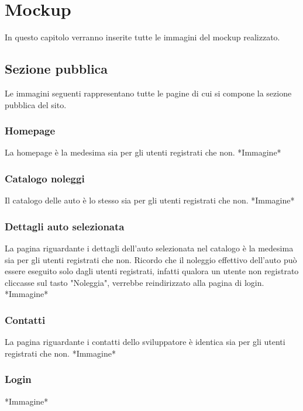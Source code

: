 \documentclass[12pt,a4paperS]{report}
\begin{document}
	\hypertarget{mockup}{\chapter{Mockup}}
	\label{mockup}
	\begin{normalsize}
		In questo capitolo verranno inserite tutte le immagini del mockup realizzato.
		
		\section{Sezione pubblica}
			Le immagini seguenti rappresentano tutte le pagine di cui si compone la sezione pubblica del sito.
			
			\subsection{Homepage}
				La homepage è la medesima sia per gli utenti registrati che non.
				\newline
				*Immagine*
				
			\subsection{Catalogo noleggi}
				Il catalogo delle auto è lo stesso sia per gli utenti registrati che non.
				\newline
				*Immagine*
			
			\subsection{Dettagli auto selezionata}
				La pagina riguardante i dettagli dell'auto selezionata nel catalogo è la medesima sia per gli utenti registrati che non.
				\newline
				Ricordo che il noleggio effettivo dell'auto può essere eseguito solo dagli utenti registrati, infatti qualora un utente non registrato cliccasse sul tasto "Noleggia", verrebbe reindirizzato alla pagina di login.
				\newline
				*Immagine*
			
			\subsection{Contatti}
				La pagina riguardante i contatti dello sviluppatore è identica sia per gli utenti registrati che non.
				\newline
				*Immagine*
			
			\subsection{Login}
				*Immagine*
			

\end{normalsize}
\end{document}
